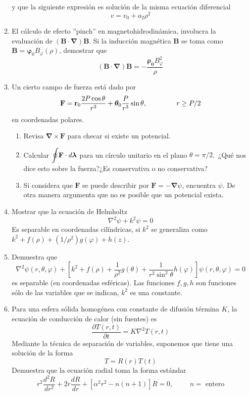 \documentclass[12pt]{article}
\begin{document}
\begin{enumerate}
y que la siguiente expresión es solución de la misma ecuación diferencial
\[ v = v_{0} + a_{2} \rho^{2} \]
\item El cálculo de efecto ''pinch'' en magnetohidrodinámica, involucra la evaluación de $(\mathbf{B} \cdot \bm{\nabla}) \mathbf{B}$. Si la inducción magnética $\mathbf{B}$ se toma como $\mathbf{B} = \bm{\varphi}_{0} B_{\varphi} (\rho)$, demostrar que
\[ (\mathbf{B} \cdot \bm{\nabla}) \mathbf{B} = - \dfrac{\bm{\rho_{0}} B_{\varphi}^{2}}{\rho}	 \]
\item Un cierto campo de fuerza está dado por
\[ \mathbf{F} = \mathbf{r}_{0} \dfrac{2 P \cos \theta}{r^{3}} + \bm{\theta}_{0} \dfrac{P}{r^{3}} \sin \theta, \hspace{1.5cm} r \geq P/2 \]
en coordenadas polares.
\begin{enumerate}
\item Revisa $\bm{\nabla} \times \mathbf{F}$ para checar si existe un potencial.
\item Calcular $\mathlarger{\oint} \mathbf{F} \cdot d \bm{\lambda}$ para un círculo unitario en el plano $\theta = \pi/2$.\
¿Qué nos dice esto sobre la fuerza?¿Es conservativa o no conservativa?
\item Si considera que $\mathbf{F}$ se puede describir por $\mathbf{F} = - \bm{\nabla}\psi$, encuentra $\psi$. De otra manera argumenta que no es posible que un potencial exista.
\end{enumerate}
\item Mostrar que la ecuación de Helmholtz
\[ \nabla^{2} \psi + k^{2} \psi = 0 \]
Es separable en coordenadas cilíndricas, si $k^{2}$ se generaliza como $k^{2} + f(\rho) + (1/\rho^{2}) g(\varphi) +  h(z)$. 
\item Demuestra que
\[ \nabla^{2} \psi(r,\theta,\varphi) + \left[ k^{2} + f(\rho) + \dfrac{1}{\rho^{2}} g(\theta) + \dfrac{1}{r^{2}\sin^{2} \theta} h(\varphi) \right] \psi (r,\theta,\varphi) = 0 \]
es separable (en coordenadas esféricas). Las funciones $f,g,h$ son funciones sólo de las variables que se indican, $k^{2}$ es una constante.
\item Para una esfera sólida homogénea con constante de difusión términa $K$, la ecuación de conducción de calor (sin fuentes) es
\[ \dfrac{\partial T(r,t)}{\partial t} =  K \nabla^{2} T(r,t) \]
Mediante la técnica de separación de variables, suponemos que tiene una solución de la forma
\[ T =R(r) T(t) \]
Demuestra que la ecuación radial toma la forma estándar
\[ r^{2} \dfrac{d^{2} R}{d r^{2}} + 2r \dfrac{d R}{d r} + \left[ \alpha^{2} r^{2} - n(n+1) \right] R = 0, \hspace{1cm} n = \mbox{ entero} \]

\end{enumerate}
\end{document}
